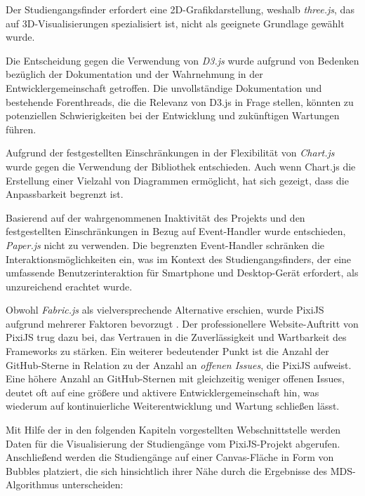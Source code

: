 
Der Studiengangsfinder erfordert eine 2D-Grafikdarstellung, weshalb
\textit{three.js}, das auf 3D-Visualisierungen spezialisiert ist, nicht als
geeignete Grundlage gewählt wurde. \parencite{threejs_threejs_2023}

Die Entscheidung gegen die Verwendung von \textit{D3.js} wurde aufgrund
von Bedenken bezüglich der Dokumentation und der Wahrnehmung in der 
Entwicklergemeinschaft getroffen. Die unvollständige Dokumentation und
bestehende Forenthreads, die die Relevanz von D3.js in Frage stellen, könnten zu
potenziellen Schwierigkeiten bei der Entwicklung und zukünftigen Wartungen
führen. \parencite{bostock_d3js_2023}


Aufgrund der festgestellten Einschränkungen in der Flexibilität von \textit{Chart.js} wurde gegen die Verwendung der Bibliothek entschieden. Auch wenn Chart.js die Erstellung einer Vielzahl von Diagrammen ermöglicht, hat sich gezeigt, dass die Anpassbarkeit begrenzt ist. \parencite{etimberg_chartjs_2023}

Basierend auf der wahrgenommenen Inaktivität des Projekts und den festgestellten 
Einschränkungen in Bezug auf Event-Handler wurde entschieden, \textit{Paper.js}
nicht zu verwenden. \parencite{lehni_paperjs_2023} Die begrenzten Event-Handler schränken
die Interaktionsmöglichkeiten ein, was im Kontext des Studiengangsfinders, der
eine umfassende Benutzerinteraktion für Smartphone und Desktop-Gerät erfordert,
als unzureichend erachtet wurde. \parencite{etimberg_paperjs_2023}

Obwohl \textit{Fabric.js} als vielversprechende Alternative erschien, wurde
PixiJS aufgrund mehrerer Faktoren bevorzugt \parencite{zaytsev_fabricjs_2023}. Der
professionellere Website-Auftritt von PixiJS trug dazu bei, das Vertrauen in
die Zuverlässigkeit und Wartbarkeit des Frameworks zu stärken. Ein weiterer
bedeutender Punkt ist die Anzahl der GitHub-Sterne in Relation zu der Anzahl an
\textit{offenen Issues}, die PixiJS aufweist. Eine höhere Anzahl an
GitHub-Sternen mit gleichzeitig weniger offenen Issues, deutet oft auf eine
größere und aktivere Entwicklergemeinschaft hin, was wiederum auf
kontinuierliche Weiterentwicklung und Wartung schließen lässt.
\parencite{batista_github_2023}

Mit Hilfe der in den folgenden Kapiteln vorgestellten Webschnittstelle werden Daten für die Visualisierung der Studiengänge vom PixiJS-Projekt abgerufen. Anschließend werden die Studiengänge auf einer Canvas-Fläche in Form von Bubbles platziert, die sich hinsichtlich ihrer Nähe durch die Ergebnisse des MDS-Algorithmus unterscheiden:

